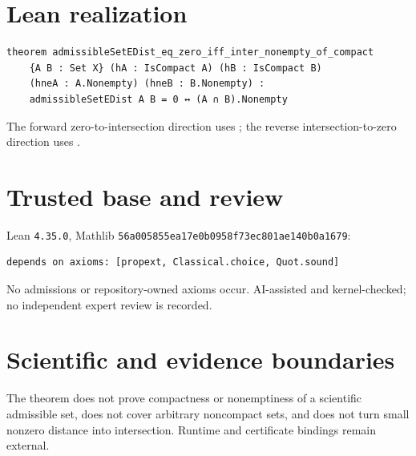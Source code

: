 \documentclass[11pt]{article}
\begin{document}
\section{Lean realization}
\begin{lstlisting}
theorem admissibleSetEDist_eq_zero_iff_inter_nonempty_of_compact
    {A B : Set X} (hA : IsCompact A) (hB : IsCompact B)
    (hneA : A.Nonempty) (hneB : B.Nonempty) :
    admissibleSetEDist A B = 0 ↔ (A ∩ B).Nonempty
\end{lstlisting}
The forward zero-to-intersection direction uses
; the reverse
intersection-to-zero direction uses
.
\section{Trusted base and review}
Lean \texttt{4.35.0}, Mathlib
\texttt{56a005855ea17e0b0958f73ec801ae140b0a1679}:
\begin{lstlisting}
depends on axioms: [propext, Classical.choice, Quot.sound]
\end{lstlisting}
No admissions or repository-owned axioms occur. AI-assisted and kernel-checked; no
independent expert review is recorded.
\section{Scientific and evidence boundaries}
The theorem does not prove compactness or nonemptiness of a scientific admissible set,
does not cover arbitrary noncompact sets, and does not turn small nonzero distance into
intersection. Runtime and certificate bindings remain external.
\end{document}
